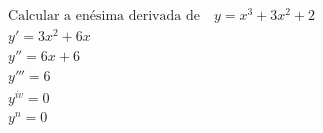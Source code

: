\begin{ex}
\begin{align}
&\text{Calcular a enésima derivada de}\quad y=x^3+3x^2+2\nonumber\\
&y'=3x^2+6x\nonumber\\
&y''=6x+6\nonumber\\
&y'''=6\nonumber\\
&y^{iv}=0\nonumber\\
&y^{n}=0\nonumber
\end{align}
\end{ex}